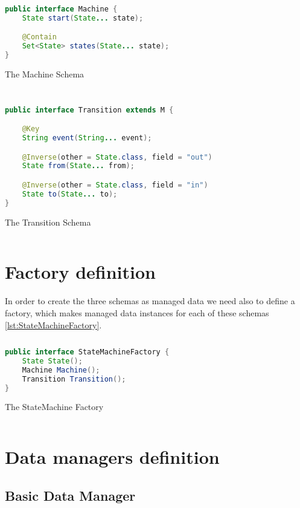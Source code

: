 \begin{sourcecode}
	\label{lst:Machine_Schema}
	\begin{lstlisting}[language=Java]
public interface Machine {
    State start(State... state);

    @Contain
    Set<State> states(State... state);
}
	\end{lstlisting}
	\caption{The Machine Schema}
\end{sourcecode}

\begin{sourcecode}
	\label{lst:Transition_Schema}
	\begin{lstlisting}[language=Java]
public interface Transition extends M {

    @Key
    String event(String... event);

    @Inverse(other = State.class, field = "out")
    State from(State... from);

    @Inverse(other = State.class, field = "in")
    State to(State... to);
}
	\end{lstlisting}
	\caption{The Transition Schema}
\end{sourcecode}

\section{Factory definition}
In order to create the three schemas as managed data we need also to define a factory, which makes managed data instances for each of these schemas \ref{lst:StateMachineFactory}.

\begin{sourcecode}
	\label{lst:StateMachineFactory}
	\begin{lstlisting}[language=Java]
public interface StateMachineFactory {
    State State();
    Machine Machine();
    Transition Transition();
}
	\end{lstlisting}
	\caption{The StateMachine Factory}
\end{sourcecode}

\section{Data managers definition}

\subsection{Basic Data Manager}

